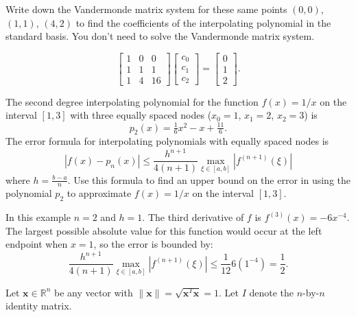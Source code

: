 \documentclass[11pt, answers]{exam}
\newcommand{\R}{\mathbb{R}}
\begin{document}
\begin{questions}
\newpage
\question Write down the Vandermonde matrix system for these same points $(0,0)$, $(1,1)$, $(4,2)$ to find the coefficients of the interpolating polynomial in the standard basis. You don't need to solve the Vandermonde matrix system.
\begin{solution}
$$\begin{bmatrix} 1 & 0 & 0 \\ 1 & 1 & 1 \\ 1 & 4 & 16\end{bmatrix} \begin{bmatrix} c_0 \\ c_1 \\ c_2 \end{bmatrix} = \begin{bmatrix} 0 \\ 1 \\ 2 \end{bmatrix}.$$
\end{solution}
\vfill


\question The second degree interpolating polynomial for the function $f(x) = 1/x$ on the interval $[1,3]$ with three equally spaced nodes ($x_0 = 1$, $x_1=2$, $x_2 =3$) is 
$$p_2(x) = \tfrac{1}{6}x^2 - x + \tfrac{11}{6}.$$
The error formula for interpolating polynomials with equally spaced nodes is 
$$|f(x)-p_n(x)| \le \frac{h^{n+1}}{4(n+1)} \max_{\xi \in [a,b]} |f^{(n+1)}(\xi)|$$ 
where $h = \tfrac{b-a}{n}$.  Use this formula to find an upper bound on the error in using the polynomial $p_2$ to approximate $f(x) = 1/x$ on the interval $[1,3]$.  
\begin{solution}
In this example $n = 2$ and $h = 1$.  The third derivative of $f$ is $f^{(3)}(x) = -6 x^{-4}$. The largest possible absolute value for this function would occur at the left endpoint when $x = 1$, so the error is bounded by:
$$ \frac{h^{n+1}}{4(n+1)} \max_{\xi \in [a,b]} |f^{(n+1)}(\xi)| \le \frac{1}{12} 6(1^{-4}) = \frac{1}{2}.$$ 
\end{solution}
\vfill



\question Let $\mathbf{x} \in \R^n$ be any vector with $\|\mathbf{x}\| = \sqrt{\mathbf{x}^T \mathbf{x}} = 1$.  Let $I$ denote the $n$-by-$n$ identity matrix.  
\end{questions}
\end{document}
